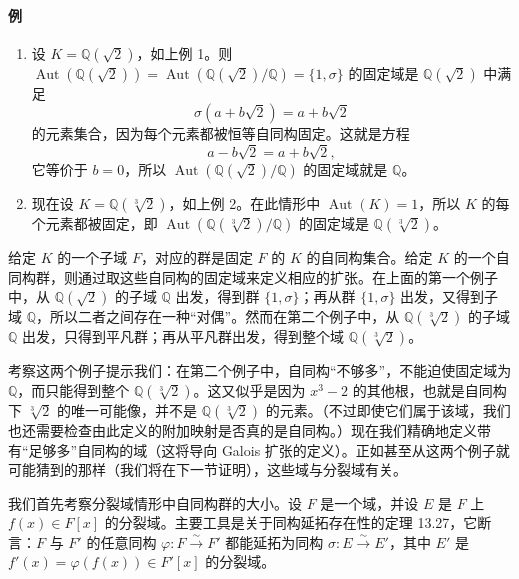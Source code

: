 \paragraph{例}
\begin{enumerate}[label=(\arabic*)]
\item 设 $K=\mathbb Q(\sqrt2)$，如上例 1。则 $\operatorname{Aut}(\mathbb Q(\sqrt2))=\operatorname{Aut}(\mathbb Q(\sqrt2)/\mathbb Q)=\{1,\sigma\}$ 的固定域是 $\mathbb Q(\sqrt2)$ 中满足
\[
\sigma(a+b\sqrt2)=a+b\sqrt2
\]
的元素集合，因为每个元素都被恒等自同构固定。这就是方程
\[
a-b\sqrt2=a+b\sqrt2,
\]
它等价于 $b=0$，所以 $\operatorname{Aut}(\mathbb Q(\sqrt2)/\mathbb Q)$ 的固定域就是 $\mathbb Q$。

\item 现在设 $K=\mathbb Q(\sqrt[3]{2})$，如上例 2。在此情形中 $\operatorname{Aut}(K)=1$，所以 $K$ 的每个元素都被固定，即 $\operatorname{Aut}(\mathbb Q(\sqrt[3]{2})/\mathbb Q)$ 的固定域是 $\mathbb Q(\sqrt[3]{2})$。
\end{enumerate}

给定 $K$ 的一个子域 $F$，对应的群是固定 $F$ 的 $K$ 的自同构集合。给定 $K$ 的一个自同构群，则通过取这些自同构的固定域来定义相应的扩张。在上面的第一个例子中，从 $\mathbb Q(\sqrt2)$ 的子域 $\mathbb Q$ 出发，得到群 $\{1,\sigma\}$；再从群 $\{1,\sigma\}$ 出发，又得到子域 $\mathbb Q$，所以二者之间存在一种“对偶”。然而在第二个例子中，从 $\mathbb Q(\sqrt[3]{2})$ 的子域 $\mathbb Q$ 出发，只得到平凡群；再从平凡群出发，得到整个域 $\mathbb Q(\sqrt[3]{2})$。

考察这两个例子提示我们：在第二个例子中，自同构“不够多”，不能迫使固定域为 $\mathbb Q$，而只能得到整个 $\mathbb Q(\sqrt[3]{2})$。这又似乎是因为 $x^3-2$ 的其他根，也就是自同构下 $\sqrt[3]{2}$ 的唯一可能像，并不是 $\mathbb Q(\sqrt[3]{2})$ 的元素。（不过即使它们属于该域，我们也还需要检查由此定义的附加映射是否真的是自同构。）现在我们精确地定义带有“足够多”自同构的域（这将导向 Galois 扩张的定义）。正如甚至从这两个例子就可能猜到的那样（我们将在下一节证明），这些域与分裂域有关。

我们首先考察分裂域情形中自同构群的大小。设 $F$ 是一个域，并设 $E$ 是 $F$ 上 $f(x)\in F[x]$ 的分裂域。主要工具是关于同构延拓存在性的定理 13.27，它断言：$F$ 与 $F'$ 的任意同构 $\varphi:F\xrightarrow{\sim}F'$ 都能延拓为同构 $\sigma:E\xrightarrow{\sim}E'$，其中 $E'$ 是 $f'(x)=\varphi(f(x))\in F'[x]$ 的分裂域。

